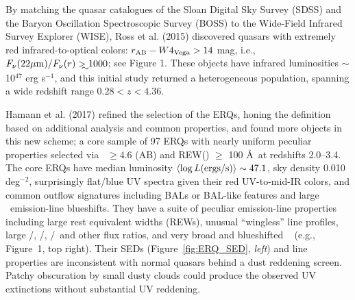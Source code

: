 \smallskip
\smallskip
\noindent
By matching the quasar catalogues of the Sloan Digital Sky Survey
(SDSS) and the Baryon Oscillation Spectroscopic Survey (BOSS) to the
Wide-Field Infrared Survey Explorer (WISE), Ross et al. (2015)
discovered quasars with extremely red infrared-to-optical colors:
$r_{\rm AB}-W4_{\rm Vega}>14$ mag, i.e., $F_\nu({\rm 22\mu
m})/F_\nu(r) \gtrsim 1000$; see Figure 1. These objects have infrared
luminosities $\sim$10$^{47}$ erg s$^{-1}$, and this initial study
returned a heterogeneous population, spanning a wide redshift range
$0.28 < z < 4.36$.

\smallskip
\smallskip
\noindent
Hamann et al. (2017) refined the selection of the ERQs, honing the
definition based on additional analysis and common properties, and
found more objects in this new scheme; a core sample of 97
ERQs with nearly uniform peculiar properties selected via \imw\ $\ge
4.6$ (AB) and REW(\civ ) $\ge$ 100 \AA\ at redshifts 2.0--3.4.  The
core ERQs have median luminosity $\left<\log L ({\rm ergs/s})\right>
\sim 47.1$, sky density 0.010 deg$^{-2}$, surprisingly flat/blue UV
spectra given their red UV-to-mid-IR colors, and common outflow
signatures including BALs or BAL-like features and large \civ\
emission-line blueshifts.  They have a suite of peculiar emission-line
properties including large rest equivalent widths (REWs), unusual
``wingless'' line profiles, large \nv /\lya , \nv /\civ , \siiv /\civ\
and other flux ratios, and very broad and blueshifted \oiii\ 
(e.g., Figure~1, top right).  Their SEDs (Figure~\ref{fig:ERQ_SED},
{\it left}) and line properties are inconsistent with normal quasars
behind a dust reddening screen. Patchy obscuration by small dusty
clouds could produce the observed UV extinctions without substantial
UV reddening.

